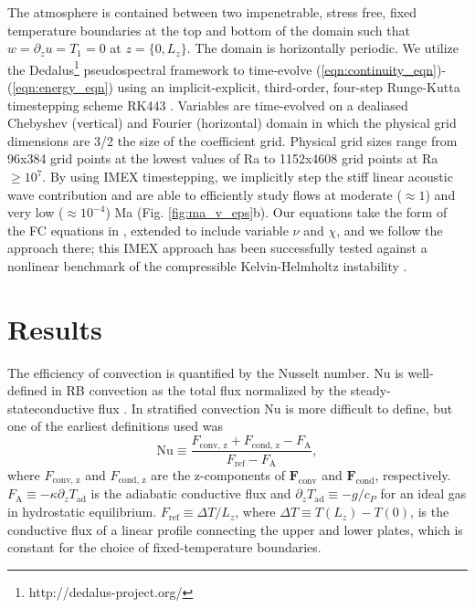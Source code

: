 \documentclass[aps, prl, twocolumn, nofootinbib, groupedaddress, amsfonts, amssymb, amsmath]{revtex4-1}
\begin{document}
The atmosphere is contained between two 
impenetrable, stress free, fixed temperature boundaries at
the top and bottom of the domain such that 
$w = \partial_z u = T_1 = 0$ at $z = \{0, L_z\}$. The domain
is horizontally periodic. We utilize the 
Dedalus\footnote{http://dedalus-project.org/} \cite{burns&all2016} pseudospectral framework 
 to time-evolve  
(\ref{eqn:continuity_eqn})-(\ref{eqn:energy_eqn}) 
using an implicit-explicit, third-order, four-step 
Runge-Kutta timestepping scheme RK443 \cite{ascher&all1997}.  
Variables are time-evolved on a dealiased Chebyshev (vertical)
and Fourier (horizontal) domain in which the
physical grid dimensions are 3/2 the size of the coefficient grid.  
Physical grid sizes range from
96x384 grid points at the lowest values of 
Ra to 1152x4608 grid points at Ra $\geq 10^{7}$. 
By using IMEX timestepping, we implicitly step the 
stiff linear acoustic wave contribution and are able to
efficiently study flows at moderate ($\approx 1$) and very low ($\approx 10^{-4}$)
Ma (Fig. \ref{fig:ma_v_eps}b).  Our equations take the form
of the FC equations in \cite{lecoanet&all2014}, extended to include variable
$\nu$ and $\chi$, and we follow the approach there; 
this IMEX approach has been successfully 
tested against a nonlinear benchmark  of the compressible 
Kelvin-Helmholtz instability \cite{Lecoanet_et_al_2016_KH}.

\section{Results}
\label{sec:results}

The efficiency of convection is quantified by the Nusselt number.  
Nu is well-defined in RB convection
as the total flux normalized by the steady-stateconductive flux 
\cite{johnston&doering2009, otero&all2002}.
In stratified convection Nu is more difficult to define, but one of the earliest definitions used
was \cite{graham1975,hurlburt&all1984}
\begin{equation}
\text{Nu} \equiv \frac{F_{\text{conv, z}} + F_{\text{cond, z}} - F_{\text{A}}}{F_{\text{ref}} - F_{\text{A}}},
\label{eqn:nusselt}
\end{equation}
where $F_{\text{conv, z}}$ and $F_{\text{cond, z}}$ are the 
z-components of $\bm{F}_{\text{conv}}$ and $\bm{F}_{\text{cond}}$,
respectively.  $F_{\text{A}} \equiv -\kappa \partial_z T_{\text{ad}}$ 
is the adiabatic conductive flux and
$\partial_z T_{\text{ad}} \equiv - g / c_{P}$ 
for an ideal gas in hydrostatic equilibrium.
$F_{\text{ref}} \equiv \Delta T / L_z$, 
where $\Delta T \equiv T(L_z) - T(0)$, is the 
conductive flux of a linear profile connecting the upper
and lower plates, which is constant for 
the choice of fixed-temperature boundaries.
\end{document}
